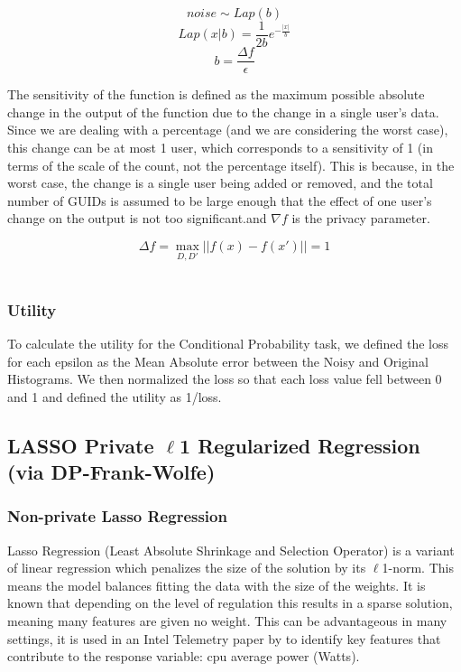\documentclass[12pt,letterpaper]{article}
\begin{document}
$$noise \sim Lap(b) $$
$$Lap(x|b) = \frac{1}{2b}e^{-\frac{|x|}{b}}$$
$$b = \frac{\Delta f}{\epsilon}$$

The sensitivity of the function is defined as the maximum possible absolute change in the output of the function due to the change in a single user's data. Since we are dealing with a percentage (and we are considering the worst case), this change can be at most 1 user, which corresponds to a sensitivity of 1 (in terms of the scale of the count, not the percentage itself). This is because, in the worst case, the change is a single user being added or removed, and the total number of GUIDs is assumed to be large enough that the effect of one user's change on the output is not too significant.and $\nabla f$ is the privacy parameter. 
\begin{center}
$$\Delta f = \max_{D, D'} ||f(x) - f(x')|| = 1$$ \\
\end{center}

\subsubsection{Utility}

To calculate the utility for the Conditional Probability task, we defined the loss for each epsilon as the Mean Absolute error between the Noisy and Original Histograms. We then normalized the loss so that each loss value fell between 0 and 1 and defined the utility as 1/loss. 

\subsection{LASSO Private $\ell$1 Regularized Regression (via DP-Frank-Wolfe)}

\subsubsection{Non-private Lasso Regression}

Lasso Regression (Least Absolute Shrinkage and Selection Operator) is a variant of linear regression which penalizes the size of the solution by its $\ell$1-norm. This means the model balances fitting the data with the size of the weights. It is known that depending on the level of regulation this results in a sparse solution, meaning many features are given no weight. This can be advantageous in many settings, it is used in an Intel Telemetry paper by \cite{lassocarbon} to identify key features that contribute to the response variable: cpu average power (Watts). 
\end{document}
